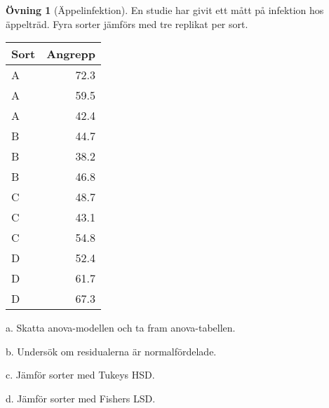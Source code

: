 \documentclass[
]{book}
\theoremstyle{definition}
\theoremstyle{definition}
\theoremstyle{definition}
\newtheorem{exercise}{Övning}[chapter]
\theoremstyle{definition}
\theoremstyle{remark}
\begin{document}
\begin{exercise}[Äppelinfektion]
En studie har givit ett mått på infektion hos äppelträd. Fyra sorter jämförs med tre replikat per sort.

\begin{table}
\centering
\begin{tabular}[t]{lr}
\toprule
Sort & Angrepp\\
\midrule
A & 72.3\\
A & 59.5\\
A & 42.4\\
B & 44.7\\
B & 38.2\\
\addlinespace
B & 46.8\\
C & 48.7\\
C & 43.1\\
C & 54.8\\
D & 52.4\\
\addlinespace
D & 61.7\\
D & 67.3\\
\bottomrule
\end{tabular}
\end{table}

a. Skatta anova-modellen och ta fram anova-tabellen.

b. Undersök om residualerna är normalfördelade.

c. Jämför sorter med Tukeys HSD.

d. Jämför sorter med Fishers LSD.
\end{exercise}
\end{document}
